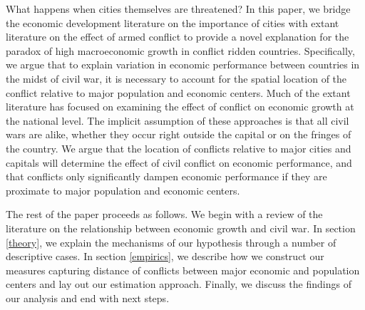 What happens when cities themselves are threatened? In this paper, we bridge the economic development literature on the importance of cities with extant literature on the effect of armed conflict to provide a novel explanation for the paradox of high macroeconomic growth in conflict ridden countries. Specifically,  we argue that to explain variation in economic performance between countries in the midst of civil war, it is necessary to account for the spatial location of the conflict relative to major population and economic centers. Much of the extant literature has focused on examining the effect of conflict on economic growth at the national level. The implicit assumption of these approaches is that all civil wars are alike, whether they occur right outside the capital or on the fringes of the country. We argue that the location of conflicts relative to major cities and capitals will determine the effect of civil conflict on economic performance, and that conflicts only significantly dampen economic performance if they are proximate to major population and economic centers. 

The rest of the paper proceeds as follows.  We begin with a review of the literature on the relationship between economic growth and civil war. In section \ref{theory}, we explain the mechanisms of our hypothesis through a number of descriptive cases. In section \ref{empirics}, we describe how we construct our measures capturing distance of conflicts between major economic and population centers and lay out our estimation approach. Finally, we discuss the findings of our analysis and end with next steps. 